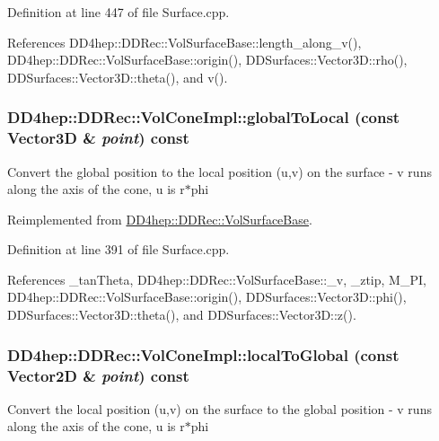 Definition at line 447 of file Surface.cpp.

References DD4hep::DDRec::VolSurfaceBase::length\_\-along\_\-v(), DD4hep::DDRec::VolSurfaceBase::origin(), DDSurfaces::Vector3D::rho(), DDSurfaces::Vector3D::theta(), and v().\hypertarget{class_d_d4hep_1_1_d_d_rec_1_1_vol_cone_impl_a427ac9a8bccf658a2161b21d6ae1267f}{
\subsubsection[{globalToLocal}]{ DD4hep::DDRec::VolConeImpl::globalToLocal (const {\bf Vector3D} \& {\em point}) const}}
\label{class_d_d4hep_1_1_d_d_rec_1_1_vol_cone_impl_a427ac9a8bccf658a2161b21d6ae1267f}
Convert the global position to the local position (u,v) on the surface -\/ v runs along the axis of the cone, u is r$\ast$phi 

Reimplemented from \hyperlink{class_d_d4hep_1_1_d_d_rec_1_1_vol_surface_base_aa5a6ee5edfdab58a13282beaef1331d4}{DD4hep::DDRec::VolSurfaceBase}.

Definition at line 391 of file Surface.cpp.

References \_\-tanTheta, DD4hep::DDRec::VolSurfaceBase::\_\-v, \_\-ztip, M\_\-PI, DD4hep::DDRec::VolSurfaceBase::origin(), DDSurfaces::Vector3D::phi(), DDSurfaces::Vector3D::theta(), and DDSurfaces::Vector3D::z().\hypertarget{class_d_d4hep_1_1_d_d_rec_1_1_vol_cone_impl_a1428d72f28ed90522cdaa6bb4d855dce}{
\subsubsection[{localToGlobal}]{ DD4hep::DDRec::VolConeImpl::localToGlobal (const {\bf Vector2D} \& {\em point}) const}}
\label{class_d_d4hep_1_1_d_d_rec_1_1_vol_cone_impl_a1428d72f28ed90522cdaa6bb4d855dce}
Convert the local position (u,v) on the surface to the global position -\/ v runs along the axis of the cone, u is r$\ast$phi 

